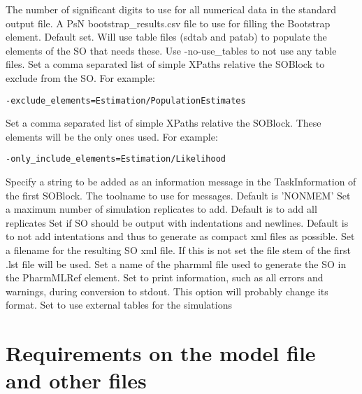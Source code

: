 \begin{optionlist}
The number of significant digits to use for all numerical data in the standard output file.
\nextopt
{}
A PsN bootstrap\_results.csv file to use for filling the Bootstrap element.
\nextopt
{}
Default set. Will use table files (sdtab and patab) to populate the elements of the SO that needs these. Use -no-use\_tables to not use any table files.
\nextopt
{}
Set a comma separated list of simple XPaths relative the SOBlock to exclude from the SO.
For example:
\begin{verbatim}
-exclude_elements=Estimation/PopulationEstimates
\end{verbatim}
\nextopt
{}
Set a comma separated list of simple XPaths relative the SOBlock. These elements will be the only ones used.
For example: 
\begin{verbatim}
-only_include_elements=Estimation/Likelihood
\end{verbatim}
\nextopt
{}
Specify a string to be added as an information message in the TaskInformation of the first SOBlock.
\nextopt
{}
The toolname to use for messages. Default is 'NONMEM'
\nextopt
{}
Set a maximum number of simulation replicates to add. Default is to add all replicates
\nextopt
{}
Set if SO should be output with indentations and newlines.
Default is to not add intentations and thus to generate as compact xml files as possible.
\nextopt
{}
Set a filename for the resulting SO xml file. If this is not set the file stem of the first .lst file will be used.
\nextopt
{}
Set a name of the pharmml file used to generate the SO
in the PharmMLRef element.
\nextopt
{}
Set to print information, such as all errors and warnings, during conversion to stdout.
\nextopt
{}
This option will probably change its format.
Set to use external tables for the simulations
\nextopt
\end{optionlist}

\section{Requirements on the model file and other files}

